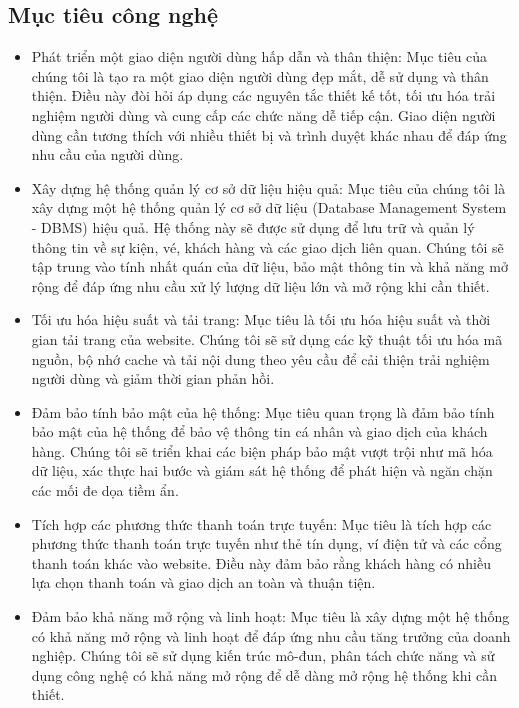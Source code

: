 \documentclass[12pt]{article}
\begin{document}
\subsection{Mục tiêu công nghệ}
\begin{itemize}[label=-, leftmargin=1cm]
\item Phát triển một giao diện người dùng hấp dẫn và thân thiện: Mục tiêu của chúng tôi là tạo ra một giao diện người dùng đẹp mắt, dễ sử dụng và thân thiện. Điều này đòi hỏi áp dụng các nguyên tắc thiết kế tốt, tối ưu hóa trải nghiệm người dùng và cung cấp các chức năng dễ tiếp cận. Giao diện người dùng cần tương thích với nhiều thiết bị và trình duyệt khác nhau để đáp ứng nhu cầu của người dùng.
\item Xây dựng hệ thống quản lý cơ sở dữ liệu hiệu quả: Mục tiêu của chúng tôi là xây dựng một hệ thống quản lý cơ sở dữ liệu (Database Management System - DBMS) hiệu quả. Hệ thống này sẽ được sử dụng để lưu trữ và quản lý thông tin về sự kiện, vé, khách hàng và các giao dịch liên quan. Chúng tôi sẽ tập trung vào tính nhất quán của dữ liệu, bảo mật thông tin và khả năng mở rộng để đáp ứng nhu cầu xử lý lượng dữ liệu lớn và mở rộng khi cần thiết.
\item Tối ưu hóa hiệu suất và tải trang: Mục tiêu là tối ưu hóa hiệu suất và thời gian tải trang của website. Chúng tôi sẽ sử dụng các kỹ thuật tối ưu hóa mã nguồn, bộ nhớ cache và tải nội dung theo yêu cầu để cải thiện trải nghiệm người dùng và giảm thời gian phản hồi.
\item Đảm bảo tính bảo mật của hệ thống: Mục tiêu quan trọng là đảm bảo tính bảo mật của hệ thống để bảo vệ thông tin cá nhân và giao dịch của khách hàng. Chúng tôi sẽ triển khai các biện pháp bảo mật vượt trội như mã hóa dữ liệu, xác thực hai bước và giám sát hệ thống để phát hiện và ngăn chặn các mối đe dọa tiềm ẩn.
\item Tích hợp các phương thức thanh toán trực tuyến: Mục tiêu là tích hợp các phương thức thanh toán trực tuyến như thẻ tín dụng, ví điện tử và các cổng thanh toán khác vào website. Điều này đảm bảo rằng khách hàng có nhiều lựa chọn thanh toán và giao dịch an toàn và thuận tiện.
\item Đảm bảo khả năng mở rộng và linh hoạt: Mục tiêu là xây dựng một hệ thống có khả năng mở rộng và linh hoạt để đáp ứng nhu cầu tăng trưởng của doanh nghiệp. Chúng tôi sẽ sử dụng kiến trúc mô-đun, phân tách chức năng và sử dụng công nghệ có khả năng mở rộng để dễ dàng mở rộng hệ thống khi cần thiết.
\end{itemize}
\end{document}
